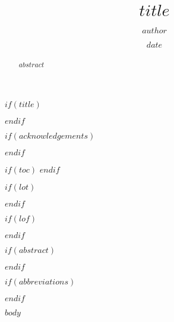 \documentclass[11pt,twoside]{MPIthesis}
\title{$title$}
\author{$author$}
\date{$date$}
\begin{document}
$if(title)$
  \maketitle
$endif$

\makepagetwo

\frontmatter %
\pagestyle{empty} %

$if(acknowledgements)$
  \begin{acknowledgements}
  \end{acknowledgements}
$endif$

$if(toc)$
  \hypersetup{linkcolor=$if(toccolor)$$toccolor$$else$black$endif$}
  \setcounter{tocdepth}{$toc-depth$}
  \tableofcontents
$endif$

$if(lot)$
  \listoftables
$endif$

$if(lof)$
  \listoffigures
$endif$

$if(abstract)$
  \begin{abstract}
    $abstract$
  \end{abstract}
$endif$

$if(abbreviations)$
{
  
}
$endif$



\mainmatter %
\pagestyle{fancyplain} %

$body$


\end{document}
